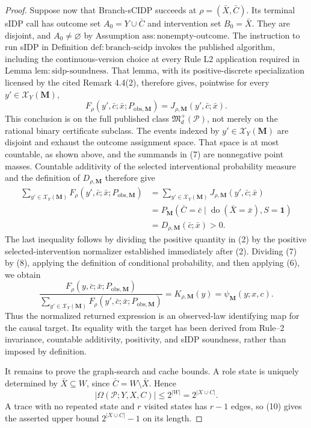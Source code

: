 \documentclass{article}
\begin{document}
\begin{proof}
Suppose now that Branch-sCIDP succeeds at \(\rho=(\bar X,\bar C)\).  Its terminal sIDP call has outcome set \(A_0=Y\cup\bar C\) and intervention set \(B_0=\bar X\).  They are disjoint, and \(A_0\neq\varnothing\) by Assumption \(\mathrm{ass{:}nonempty\text{-}outcome}\).  The instruction to run sIDP in Definition \(\mathrm{def{:}branch\text{-}scidp}\) invokes the published algorithm, including the continuous-version choice at every Rule L2 application required in Lemma \(\mathrm{lem{:}sidp\text{-}soundness}\).  That lemma, with its positive-discrete specialization licensed by the cited Remark 4.4(2), therefore gives, pointwise for every \(y'\in\mathcal X_Y(\mathbf M)\),
\[
 F_\rho(y',\bar c;\bar x;P_{\mathrm{obs},\mathbf M})
 =J_{\rho,\mathbf M}(y',\bar c;\bar x).
 \tag{7}
\]
This conclusion is on the full published class \(\mathfrak M_d^+(\mathcal P)\), not merely on the rational binary certificate subclass.  The events indexed by \(y'\in\mathcal X_Y(\mathbf M)\) are disjoint and exhaust the outcome assignment space.  That space is at most countable, as shown above, and the summands in (7) are nonnegative point masses.  Countable additivity of the selected interventional probability measure and the definition of \(D_{\rho,\mathbf M}\) therefore give
\[
\begin{aligned}
 \sum_{y'\in\mathcal X_Y(\mathbf M)}
 F_\rho(y',\bar c;\bar x;P_{\mathrm{obs},\mathbf M})
 &=\sum_{y'\in\mathcal X_Y(\mathbf M)}
 J_{\rho,\mathbf M}(y',\bar c;\bar x)\\
 &=P_{\mathbf M}\!\left(
 \bar C=\bar c\mid\operatorname{do}(\bar X=\bar x),S=\mathbf 1\right)\\
 &=D_{\rho,\mathbf M}(\bar c;\bar x)>0.
\end{aligned}
\tag{8}
\]
The last inequality follows by dividing the positive quantity in (2) by the positive selected-intervention normalizer established immediately after (2).  Dividing (7) by (8), applying the definition of conditional probability, and then applying (6), we obtain
\[
 \frac{F_\rho(y,\bar c;\bar x;P_{\mathrm{obs},\mathbf M})}
 {\sum_{y'\in\mathcal X_Y(\mathbf M)}
 F_\rho(y',\bar c;\bar x;P_{\mathrm{obs},\mathbf M})}
 =K_{\rho,\mathbf M}(y)
 =\psi_{\mathbf M}(y;x,c).
 \tag{9}
\]
Thus the normalized returned expression is an observed-law identifying map for the causal target.  Its equality with the target has been derived from Rule--2 invariance, countable additivity, positivity, and sIDP soundness, rather than imposed by definition.

It remains to prove the graph-search and cache bounds.  A role state is uniquely determined by \(\bar X\subseteq W\), since \(\bar C=W\setminus\bar X\).  Hence
\[
 |\Omega(\mathcal P;Y,X,C)|\leq 2^{|W|}=2^{|X\cup C|}.
 \tag{10}
\]
A trace with no repeated state and \(r\) visited states has \(r-1\) edges, so (10) gives the asserted upper bound \(2^{|X\cup C|}-1\) on its length.


\end{proof}
\end{document}
